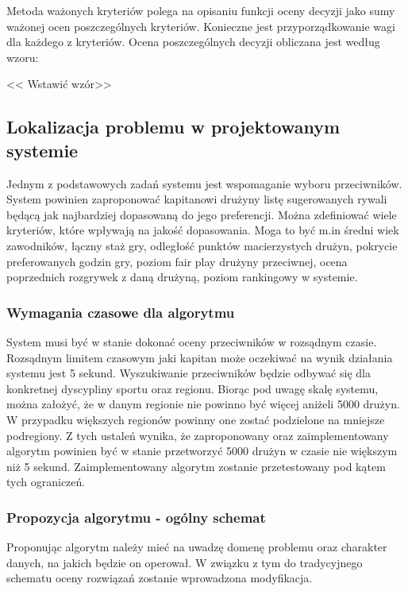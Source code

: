\documentclass[a4paper,11pt]{article}
\begin{document}
Metoda ważonych kryteriów polega na opisaniu funkcji oceny decyzji jako sumy ważonej ocen poszczególnych kryteriów. Konieczne jest przyporządkowanie wagi dla każdego z kryteriów. Ocena poszczególnych decyzji obliczana jest według wzoru: 

<< Wstawić wzór>>

\subsection{Lokalizacja problemu w projektowanym systemie}

Jednym z podstawowych zadań systemu jest wspomaganie wyboru przeciwników. System powinien zaproponować kapitanowi drużyny listę sugerowanych rywali będącą jak najbardziej dopasowaną do jego preferencji. Można zdefiniować wiele kryteriów, które wpływają na jakość dopasowania. Moga to być m.in średni wiek zawodników, łączny staż gry, odległość punktów macierzystych drużyn, pokrycie preferowanych godzin gry, poziom fair play drużyny przeciwnej, ocena poprzednich rozgrywek z daną drużyną, poziom rankingowy w systemie. 

\subsubsection{Wymagania czasowe dla algorytmu}

System musi być w stanie dokonać oceny przeciwników w rozsądnym czasie. Rozsądnym limitem czasowym jaki kapitan może oczekiwać na wynik działania systemu jest 5 sekund. Wyszukiwanie przeciwników będzie odbywać się dla konkretnej dyscypliny sportu oraz regionu. Biorąc pod uwagę skalę systemu, można założyć, że w danym regionie nie powinno być więcej aniżeli 5000 drużyn. W przypadku większych regionów powinny one zostać podzielone na mniejsze podregiony. Z tych ustaleń wynika, że zaproponowany oraz zaimplementowany algorytm powinien być w stanie przetworzyć 5000 drużyn w czasie nie większym niż 5 sekund. Zaimplementowany algorytm zostanie przetestowany pod kątem tych ograniczeń.

\subsubsection{Propozycja algorytmu - ogólny schemat}

Proponując algorytm należy mieć na uwadzę domenę problemu oraz charakter danych, na jakich będzie on operował. W związku z tym do tradycyjnego schematu oceny rozwiązań zostanie wprowadzona modyfikacja.
\end{document}
